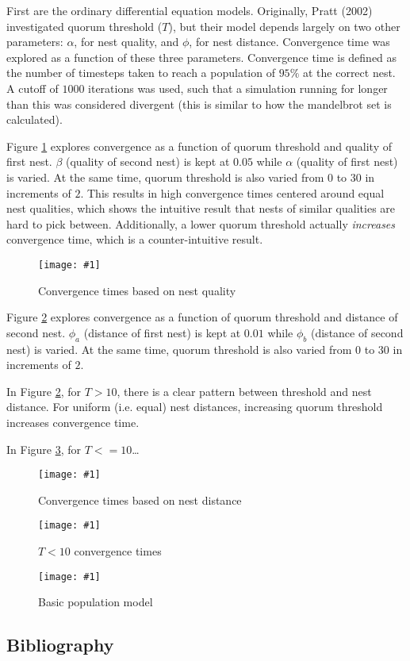 \documentclass{article}
\newcommand{\plot}[3]{
    \begin{figure}[h]
        \texttt{[image: \#1]}
        \caption{#2}
        \label{fig:#1}
    \end{figure}
}
\begin{document}
First are the ordinary differential equation models.
Originally, Pratt (2002) investigated quorum threshold ($T$), but their model depends largely on two other parameters: $\alpha$, for nest quality, and $\phi$, for nest distance.
Convergence time was explored as a function of these three parameters. 
Convergence time is defined as the number of timesteps taken to reach a population of $95\%$ at the correct nest.
A cutoff of $1000$ iterations was used, such that a simulation running for longer than this was considered divergent (this is similar to how the mandelbrot set is calculated).

Figure \ref{fig:convergence_times} explores convergence as a function of quorum threshold and quality of first nest. 
$\beta$ (quality of second nest) is kept at $0.05$ while $\alpha$ (quality of first nest) is varied.
At the same time, quorum threshold is also varied from $0$ to $30$ in increments of $2$.
This results in high convergence times centered around equal nest qualities, which shows the intuitive result that nests of similar qualities are hard to pick between.
Additionally, a lower quorum threshold actually \emph{increases} convergence time, which is a counter-intuitive result.

\plot{convergence_times}{Convergence times based on nest quality}{0.6}

Figure \ref{fig:distance_convergence_times} explores convergence as a function of quorum threshold and distance of second nest. 
$\phi_a$ (distance of first nest) is kept at $0.01$ while $\phi_b$ (distance of second nest) is varied.
At the same time, quorum threshold is also varied from $0$ to $30$ in increments of $2$.

In Figure \ref{fig:distance_convergence_times}, for $T > 10$, there is a clear pattern between threshold and nest distance. 
For uniform (i.e. equal) nest distances, increasing quorum threshold increases convergence time.

In Figure \ref{fig:distance_convergence_times_low_T}, for $T <= 10$\dots

\plot{distance_convergence_times}{Convergence times based on nest distance}{0.6}

\plot{distance_convergence_times_low_T}{$T < 10$ convergence times}{0.6}

\plot{agent_based_population_model}{Basic population model}{0.6}



\subsection{Bibliography}
  

\footnotesize


\end{document}
